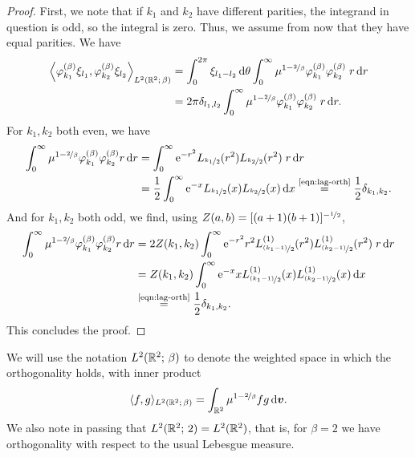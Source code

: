 \begin{proof}
First, we note that if $k_1$ and $k_2$ have different parities, the integrand in question is odd, so the
integral is zero. Thus, we assume from now that they have equal parities. We have
\begin{align*}
    \left\langle \varphi^{(\beta)}_{k_1}\xi_{l_1}, \varphi^{(\beta)}_{k_2}\xi_{l_2}
    \right\rangle_{L^2(\mathbb{R}^2;\,\beta)}
    &= \int_0^{2\pi} \xi_{l_1-l_2} \,\mathrm{d}\theta \int_0^\infty \mu^{1-\nicefrac{2}{\beta}}
       \varphi_{k_1}^{(\beta)} \varphi_{k_2}^{(\beta)}\; r \,\mathrm{d} r \\
    &= 2\pi\delta_{l_1,l_2} \int_0^\infty \mu^{1-\nicefrac{2}{\beta}}
       \varphi_{k_1}^{(\beta)} \varphi_{k_2}^{(\beta)} \;r \,\mathrm{d} r. \\
\end{align*}
For $k_1, k_2$ both even, we have
\begin{align*}
    \int_0^\infty \mu^{1-\nicefrac{2}{\beta}} \varphi_{k_1}^{(\beta)} \varphi_{k_2}^{(\beta)} r \,\mathrm{d} r
    &= \int_0^\infty \mathrm{e}^{-r^2} L_{\nicefrac{k_1}{2}}(r^2) L_{\nicefrac{k_2}{2}}(r^2)\; r \,\mathrm{d} r \\
    &= \frac{1}{2} \int_0^\infty \mathrm{e}^{-x} L_{\nicefrac{k_1}{2}}(x) L_{\nicefrac{k_2}{2}}(x) \,\mathrm{d} x
    \overset{\text{\eqref{eqn:lag-orth}}}{=} \frac{1}{2} \delta_{k_1,k_2}.
\end{align*}
And for $k_1, k_2$ both odd, we find, using $Z(a,b)=[(a+1)(b+1)]^{-\nicefrac{1}{2}}$,
\begin{align*}
    \int_0^\infty \mu^{1-\nicefrac{2}{\beta}} \varphi_{k_1}^{(\beta)} \varphi_{k_2}^{(\beta)} r \,\mathrm{d} r
    &= 2Z(k_1,k_2) \int_0^\infty
       \mathrm{e}^{-r^2} r^2 L^{(1)}_{\nicefrac{(k_1-1)}{2}}(r^2) L^{(1)}_{\nicefrac{(k_2-1)}{2}}(r^2)\; r \,\mathrm{d} r \\
    &= Z(k_1,k_2) \int_0^\infty
       \mathrm{e}^{-x} x L^{(1)}_{\nicefrac{(k_1-1)}{2}}(x) L^{(1)}_{\nicefrac{(k_2-1)}{2}}(x) \,\mathrm{d} x \\
    & \overset{\text{\eqref{eqn:lag-orth}}}{=} \frac{1}{2} \delta_{k_1,k_2}.
\end{align*}
This concludes the proof.
\end{proof}
We will use the notation $L^2(\mathbb{R}^2;\,\beta)$ to denote the weighted space in which the orthogonality holds,
with inner product
\[
    \langle f,g \rangle_{L^2(\mathbb{R}^2;\,\beta)} = \int_{\mathbb{R}^2} \mu^{1-\nicefrac{2}{\beta}} f g \,\mathrm{d}{\bm v}.
\]
We also note in passing that $L^2(\mathbb{R}^2;\,2)=L^2(\mathbb{R}^2)$, that is, for $\beta=2$ we have orthogonality with
respect to the usual Lebesgue measure.

